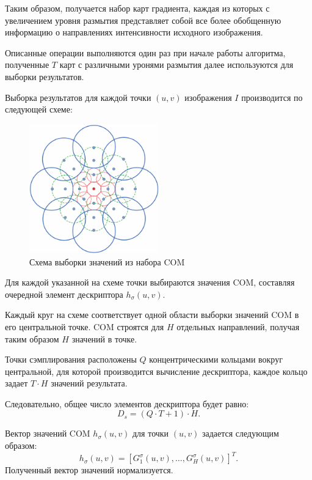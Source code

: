 {{{{		Таким образом, получается набор карт градиента, каждая из которых с увеличением уровня размытия представляет собой все более обобщенную информацию о направлениях интенсивности исходного изображения. 
		
		Описанные операции выполняются один раз при начале работы алгоритма, полученные $T$ карт с различными уронями размытия далее используются для выборки результатов. 
		
		Выборка результатов для каждой точки $(u,v)$ изображения $I$ производится по следующей схеме:
		
		\begin{figure}[H]
			\centering                             
			\includegraphics[width=0.5\textwidth,keepaspectratio]{daisy/DAISY-descriptor-structure.png}   
			\centering\caption{ Схема выборки значений из набора COM }
			\label{daisy_pattern}                           
		\end{figure}    
		
		Для каждой указанной на схеме точки выбираются значения COM, составляя очередной элемент дескриптора $h_\sigma(u,v)$. 
		
	    Каждый круг на схеме соответствует одной области выборки значений COM в его центральной точке. COM строятся для $H$ отдельных направлений, получая таким образом $H$ значений в точке.
		
		Точки сэмплирования расположены $Q$ концентрическими кольцами вокруг центральной, для которой производится вычисление дескриптора, каждое кольцо задает $T \cdot H$ значений результата.
		
		Следовательно, общее число элементов дескриптора будет равно:
		\begin{equation}\label{elements_count}
		 D_s=(Q \cdot T+1)\cdot H.
		\end{equation}
		
		Вектор значений COM $h_\sigma(u,v)$ для точки $(u,v)$ задается следующим образом:
		\begin{equation}\label{single_vector}
		h_\sigma(u,v) = \left[G_1^\sigma(u,v), \dots, G_H^\sigma(u,v)\right]^T.
		\end{equation}
		Полученный вектор значений нормализуется. 
		
}}}}
